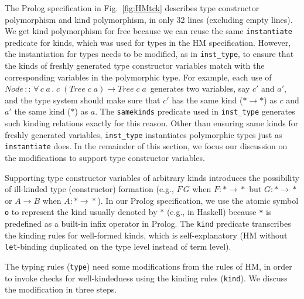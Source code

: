 \documentclass[runningheads,a4paper]{llncs}
\begin{document}
The Prolog specification in Fig.~\ref{fig:HMtck} describes
type constructor polymorphism and kind polymorphism, in only 32 lines
(excluding empty lines). We get kind polymorphism for free because
we can reuse the same \verb|instantiate| predicate for kinds, which was
used for types in the HM specification. However, the instantiation for
types needs to be modified, as in \verb|inst_type|, to ensure that
the kinds of freshly generated type constructor variables match with
the corresponding variables in the polymorphic type. For example, each use of
$\textit{Node}\,::\,
 \forall\,c\;a\,.\;c\;(\textit{Tree}\;c\;a)\to\textit{Tree}\;c\;a\,$
generates two variables, say $c'$ and $a'$, and the type system
should make sure that $c'$ has the same kind ($*\to*$) as $c$
and $a'$ the same kind ($*$) as $a$.
The \verb|samekinds| predicate used in \verb|inst_type| generates such
kinding relations exactly for this reason. Other than ensuring same kinds for
freshly generated variables, \verb|inst_type| instantiates polymorphic types
just as \verb|instantiate| does. In the remainder of this section, we focus
our discussion on the modifications to support type constructor variables.

Supporting type constructor variables of
arbitrary kinds introduces the possibility of ill-kinded type (constructor)
formation (e.g., $F\,G$ when $F:*\!\to\!*$ but $G:*\!\to\!*$ \;or\; 
$A\!\to\!B$ when $A:*\!\to\!*$). In our Prolog specification, we use
the atomic symbol \verb|o| to represent the kind usually denoted by $*$
(e.g., in Haskell) because \verb|*| is predefined as a built-in infix
operator in Prolog. The \verb|kind| predicate transcribes the kinding rules
for well-formed kinds, which is self-explanatory (HM without
\texttt{let}-binding duplicated on the type level instead of term level).

The typing rules (\verb|type|) need some modifications from the rules of HM,
in order to invoke checks for well-kindedness using the kinding rules
(\verb|kind|). We discuss the modification in three steps.
\end{document}
